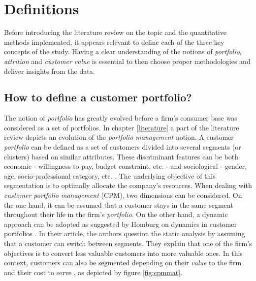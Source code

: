 \documentclass[
]{book}
\begin{document}
\hypertarget{definitions}{%
\chapter{Definitions}\label{definitions}}

Before introducing the literature review on the topic and the quantitative methods implemented, it appears relevant to define each of the three key concepts of the study. Having a clear understanding of the notions of \emph{portfolio}, \emph{attrition} and \emph{customer value} is essential to then choose proper methodologies and deliver insights from the data.

\hypertarget{how-to-define-a-customer-portfolio}{%
\section{How to define a customer portfolio?}\label{how-to-define-a-customer-portfolio}}

The notion of \emph{portfolio} has greatly evolved before a firm's consumer base was considered as a set of portfolios. In chapter \ref{literature} a part of the literature review depicts an evolution of the \emph{portfolio management} notion. A customer \emph{portfolio} can be defined as a set of customers divided into several segments (or clusters) based on similar attributes. These discriminant features can be both economic - willingness to pay, budget constraint, etc. - and sociological - gender, age, socio-professional category, etc. . The underlying objective of this segmentation is to optimally allocate the company's resources. When dealing with \emph{customer portfolio management} (CPM), two dimensions can be considered. On the one hand, it can be assumed that a customer stays in the same segment throughout their life in the firm's \emph{portfolio}. On the other hand, a dynamic approach can be adopted as suggested by Homburg on dynamics in customer portfolios \citep{MANAGING_DYNAMICS_CUSTOMER_PORTFOLIO}. In their article, the authors question the static analysis by assuming that a customer can switch between segments. They explain that one of the firm's objectives is to convert less valuable customers into more valuable ones. In this context, customers can also be segmented depending on their \emph{value} to the firm and their cost to serve \citep{CPM_CRM}, as depicted by figure \ref{fig:cpmmat}.
\end{document}
